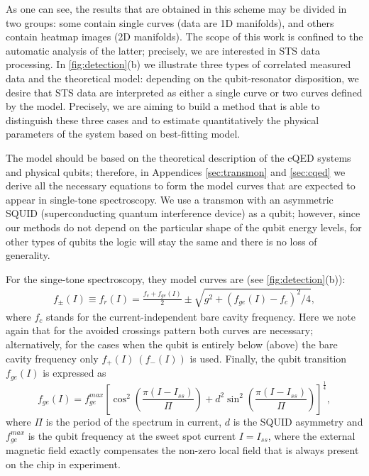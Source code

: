 \documentclass[%
 aip,
 draft,
 amsmath,amssymb,
 reprint,%
]{revtex4-1}
\begin{document}
As one can see, the results that are obtained in this scheme may be divided in two groups: some contain single curves (data are 1D manifolds), and others contain heatmap images (2D manifolds). The scope of this work is confined to the automatic analysis of the latter; precisely, we are interested in STS data processing. In \autoref{fig:detection}(b) we illustrate three types of correlated measured data and the theoretical model: depending on the qubit-resonator disposition, we desire that STS data are interpreted as either a single curve or two curves defined by the model. Precisely, we are aiming to build a method that is able to distinguish these three cases and to estimate quantitatively the physical parameters of the system based on best-fitting model. 

The model should be based on the theoretical description of the cQED systems and physical qubits; therefore, in Appendices \ref{sec:transmon} and \ref{sec:cqed} we derive all the necessary equations to form the model curves that are expected to appear in single-tone spectroscopy. We use a transmon\cite{koch2007} with an asymmetric SQUID (superconducting quantum interference device) as a qubit; however, since our methods do not depend on the particular shape of the qubit energy levels, for other types of qubits the logic will stay the same and there is no loss of generality.

For the singe-tone spectroscopy, they model curves are (see \autoref{fig:detection}(b)):
\begin{align}
f_\pm(I) \equiv f_r(I) = \frac{f_c + f_{ge}(I)}{2} \pm \sqrt{g^2+(f_{ge}(I) - f_c)^2/4},\label{eq:f_r}
\end{align}
where $f_c$ stands for the current-independent bare cavity frequency. Here we note again that for the avoided crossings pattern both curves are necessary; alternatively, for the cases when the qubit is entirely below (above) the bare cavity frequency only $ f_+(I)\ \left(f_-(I)\right)$ is used. Finally, the qubit transition $f_{ge}(I)$ is expressed as
\begin{equation}
f_{ge}(I) = f_{ge}^{max} \left[\cos^2\left(\frac{\pi(I-I_{ss})}{\Pi}\right)+d^2 \sin^2 \left(\frac{\pi(I-I_{ss})}{\Pi}\right)\right]^\frac{1}{4},
\label{eq:tr_spectrum}
\end{equation}
where $\Pi$ is the period of the spectrum in current, $d$ is the SQUID asymmetry and $f_{ge}^{max}$ is the qubit frequency at the sweet spot current $I = I_{ss}$, where the external magnetic field exactly compensates the non-zero local field that is always present on the chip in experiment.
\end{document}
